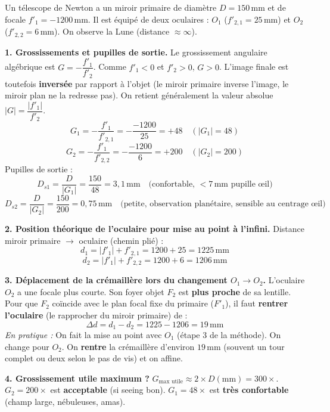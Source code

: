 \documentclass[11pt]{article}
\newcounter{popsec}
\newcounter{popsub}
\newcommand{\courssub}[1]{%
  \stepcounter{popsub}%
  \par\vspace{9pt}\noindent{\popxbold\fontsize{11.5}{13}\selectfont\color{popink}{\color{poporange}\thepopsec.\thepopsub}\hspace{6pt}#1}\par\nopagebreak\vspace{4pt}
}
\begin{document}
\begin{exoresolu}
Un télescope de Newton a un miroir primaire de diamètre $D = 150\,\text{mm}$ et de focale $f'_1 = -1200\,\text{mm}$. Il est équipé de deux oculaires : $O_1$ ($f'_{2,1} = 25\,\text{mm}$) et $O_2$ ($f'_{2,2} = 6\,\text{mm}$). On observe la Lune (distance $\approx \infty$).

\textbf{1. Grossissements et pupilles de sortie.}
Le grossissement angulaire algébrique est $G = -\dfrac{f'_1}{f'_2}$. Comme $f'_1 < 0$ et $f'_2 > 0$, $G > 0$. L'image finale est toutefois \textbf{inversée} par rapport à l'objet (le miroir primaire inverse l'image, le miroir plan ne la redresse pas). On retient généralement la valeur absolue $|G| = \dfrac{|f'_1|}{f'_2}$.
\[
G_1 = -\frac{f'_1}{f'_{2,1}} = -\frac{-1200}{25} = +48 \quad (|G_1| = 48)
\]
\[
G_2 = -\frac{f'_1}{f'_{2,2}} = -\frac{-1200}{6} = +200 \quad (|G_2| = 200)
\]
Pupilles de sortie :
\[
D_{s1} = \frac{D}{|G_1|} = \frac{150}{48} = 3,1\,\text{mm} \quad \text{(confortable, $< 7\,\text{mm}$ pupille œil)}
\]
\[
D_{s2} = \frac{D}{|G_2|} = \frac{150}{200} = 0,75\,\text{mm} \quad \text{(petite, observation planétaire, sensible au centrage œil)}
\]

\textbf{2. Position théorique de l'oculaire pour mise au point à l'infini.}
Distance miroir primaire $\rightarrow$ oculaire (chemin plié) :
\[
d_1 = |f'_1| + f'_{2,1} = 1200 + 25 = 1225\,\text{mm}
\]
\[
d_2 = |f'_1| + f'_{2,2} = 1200 + 6 = 1206\,\text{mm}
\]

\textbf{3. Déplacement de la crémaillère lors du changement $O_1 \to O_2$.}
L'oculaire $O_2$ a une focale plus courte. Son foyer objet $F_2$ est \textbf{plus proche} de sa lentille. Pour que $F_2$ coïncide avec le plan focal fixe du primaire ($F'_1$), il faut \textbf{rentrer l'oculaire} (le rapprocher du miroir primaire) de :
\[
\Delta d = d_1 - d_2 = 1225 - 1206 = 19\,\text{mm}
\]
\emph{En pratique :} On fait la mise au point avec $O_1$ (étape 3 de la méthode). On change pour $O_2$. On \textbf{rentre} la crémaillère d'environ $19\,\text{mm}$ (souvent un tour complet ou deux selon le pas de vis) et on affine.

\textbf{4. Grossissement utile maximum ?}
$G_{\text{max utile}} \approx 2 \times D(\text{mm}) = 300\times$. $G_2 = 200\times$ est \textbf{acceptable} (si seeing bon). $G_1 = 48\times$ est \textbf{très confortable} (champ large, nébuleuses, amas).
\end{exoresolu}

\courssub{Bilan et savoir-faire à retenir}
\end{document}
